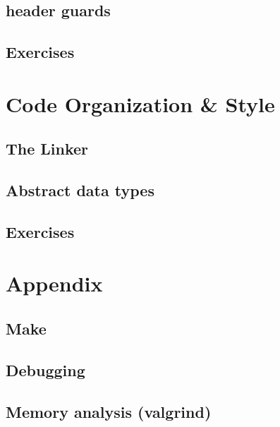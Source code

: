 \documentclass[ebook,11pt,oneside,openany]{memoir}
\begin{document}
\section{header guards}
\section{Exercises}

\chapter{Code Organization \& Style}
\label{ch:org}
\section{The Linker}
\section{Abstract data types}
\section{Exercises}

\chapter{Appendix}
\section{Make}
\section{Debugging}
\section{Memory analysis (valgrind)}
\end{document}
